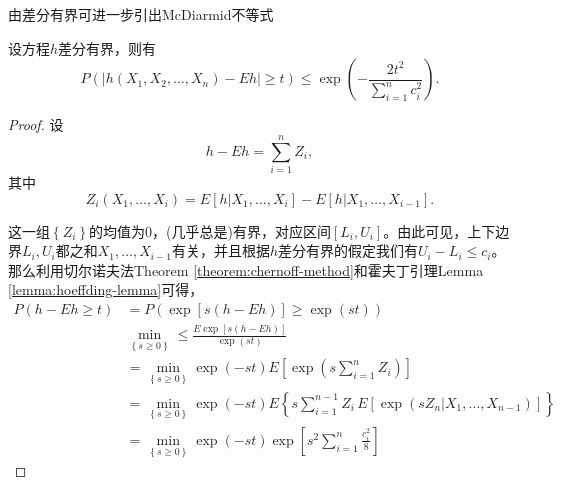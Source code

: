 由差分有界可进一步引出McDiarmid不等式
\begin{theorem}[McDiarmid不等式]
  \label{theorem:mcdiamid-inequality}
  设方程$h$差分有界，则有
  \begin{equation}
    \label{eq:mcdiamid-inequality}
    P \left(
    \left|
    h \left( X_{1}, X_{2}, \ldots, X_{n} \right)
    - E h
    \right| \ge t
     \right)
     \le \exp
     \left(
     - \frac{2 t^{2}}{\sum_{i=1}^{n} c_{i}^{2}}
     \right).
  \end{equation}
\end{theorem}
\begin{proof}
  设
  \begin{equation*}
    h - E h = \sum_{i=1}^{n} Z_{i},
  \end{equation*}
  其中
  \begin{equation*}
    Z_{i} \left( X_{1}, \ldots, X_{i} \right) = E
    \left[
    h | X_{1},\ldots,X_{i}
    \right]
    - E
    \left[
    h | X_{1},\ldots,X_{i-1}
    \right].
  \end{equation*}

  这一组$\left\{ Z_{i} \right\}$的均值为$0$，(几乎总是)有界，对应区间$\left[ L_{i}, U_{i} \right]$。由此可见，上下边界$L_{i}, U_{i}$都之和$X_{1},\ldots,X_{i-1}$有关，并且根据$h$差分有界的假定我们有$U_{i} - L_{i} \le c_{i}$。那么利用切尔诺夫法Theorem \ref{theorem:chernoff-method}和霍夫丁引理Lemma \ref{lemma:hoeffding-lemma}可得，
  \begin{equation}
    \label{eq:mcdiamid-inequality-mid1}
    \begin{split}
      P \left( h - Eh \ge t \right)
      & = P
      \left(
      \exp \left[
      s \left( h - Eh \right)
      \right]
      \ge \exp \left( s t \right)
      \right) \\
      & \min_{\left\{ s \ge 0 \right\}}
      \le \frac{
      E \exp \left[ s \left( h - E h \right) \right]
      }{
      \exp \left( st \right)
      } \\
      & = \min_{\left\{ s \ge 0 \right\}}
      \exp \left( - s t \right) E
      \left[
      \exp \left(
      s \sum_{i=1}^{n} Z_{i}
      \right)
      \right] \\
      & = \min_{\left\{ s \ge 0 \right\}}
      \exp \left( - s t \right)
      E \left\{
      s \sum_{i=1}^{n-1} Z_{i} \,
      E \left[ \exp \left( s Z_{n} | X_{1}, \ldots, X_{n-1} \right) \right]
      \right\} \\
      & = \min_{\left\{ s \ge 0 \right\}}
      \exp \left( - s t \right)
      \exp \left[
      s^{2} \sum_{i=1}^{n} \frac{c_{i}^{2}}{8}
      \right]
    \end{split}
  \end{equation}


\end{proof}
